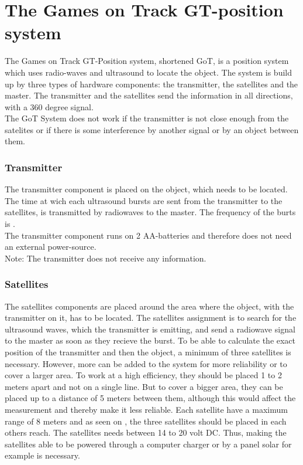 \section{The Games on Track GT-position system}
\label{GoTDescription}
The Games on Track GT-Position system, shortened GoT, is a position system which uses radio-waves and ultrasound to locate the object. The system is build up by three types of hardware components: the transmitter, the satellites and the master. The transmitter and the satellites send the information in all directions, with a 360 degree signal.\\
The GoT System does not work if the transmitter is not close enough from the satelites or if there is some interference by another signal or by an object between them.

\subsubsection{Transmitter}
The transmitter component is placed on the object, which needs to be located. The time at wich each ultrasound bursts are sent from the transmitter to the satellites, is transmitted by radiowaves to the master. The frequency of the burts is .\\
The transmitter component runs on 2 AA-batteries and therefore does not need an external power-source.\\
Note: The transmitter does not receive any information.

\subsubsection{Satellites}
The satellites components are placed around the area where the object, with the transmitter on it, has to be located. The satellites assignment is to search for the ultrasound waves, which the transmitter is emitting, and send a radiowave signal to the master as soon as they recieve the burst.
To be able to calculate the exact position of the transmitter and then the object, a minimum of three satellites is necessary. However, more can be added to the system for more reliability or to cover a larger area. To work at a high efficiency, they should be placed 1 to 2 meters apart and not on a single line. But to cover a bigger area, they can be placed up to a distance of 5 meters between them, although this would affect the measurement and thereby make it less reliable. Each satellite have a maximum range of 8 meters and as seen on , the three satellites should be placed in each others reach. The satellites needs between 14 to 20 volt DC. Thus, making the satellites able to be powered through a computer charger or by a panel solar for example is necessary.

